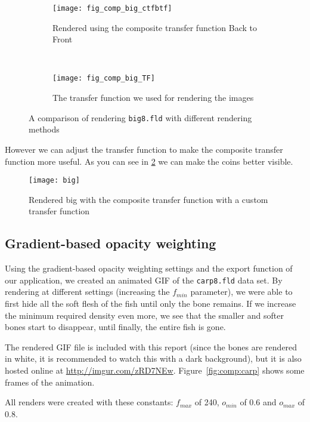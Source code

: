 \begin{figure}[H]
	\ContinuedFloat
	\centering
	\begin{subfigure}[t]{0.45\textwidth}
		\texttt{[image: fig\_comp\_big\_ctfbtf]}
		\caption{Rendered using the composite transfer function Back to Front}
	\end{subfigure}
	~%
	\begin{subfigure}[t]{0.45\textwidth}
		\texttt{[image: fig\_comp\_big\_TF]}
		\caption{The transfer function we used for rendering the images}
	\end{subfigure}
	
	\caption{A comparison of rendering \texttt{big8.fld} with different rendering methods}
	\label{fig:comp:big}
\end{figure}	
However we can adjust the transfer function to make the composite transfer function more useful.
As you can see in \ref{fig:comp:biggie} we can make the coins better visible.
\begin{figure}[H]
	\centering
		\texttt{[image: big]}
		\caption{Rendered big with the composite transfer function with a custom transfer function}
	\label{fig:comp:biggie}
\end{figure}
\subsection{Gradient-based opacity weighting}
Using the gradient-based opacity weighting settings and the export function of our application, we created an animated GIF of the \texttt{carp8.fld} data set.
By rendering at different settings (increasing the $f_{min}$ parameter), we were able to first hide all the soft flesh of the fish until only the bone remains.
If we increase the minimum required density even more, we see that the smaller and softer bones start to disappear, until finally, the entire fish is gone.

The rendered GIF file is included with this report (since the bones are rendered in white, it is recommended to watch this with a dark background), but it is also hosted online at \url{http://imgur.com/zRD7NEw}.
Figure~\ref{fig:comp:carp} shows some frames of the animation.

All renders were created with these constants: $f_{max}$ of 240, $o_{min}$ of $0.6$ and $o_{max}$ of $0.8$.

